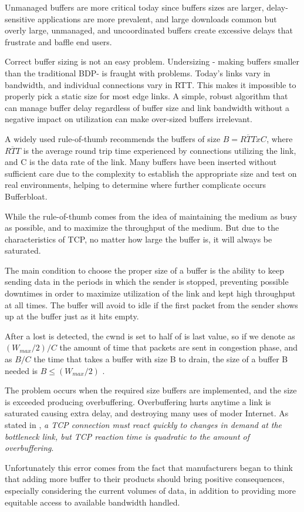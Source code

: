 Unmanaged buffers are more critical today since buffers sizes are larger,
delay-sensitive applications are more prevalent, and large downloads common
but overly large, unmanaged, and uncoordinated buffers create excessive delays
that frustrate and baffle end users.

Correct buffer sizing is not an easy problem. Undersizing - making buffers
smaller than the traditional BDP- is fraught with problems. Today's links vary
in bandwidth, and individual connections vary in RTT. This makes it impossible
to properly pick a static size for most edge links. A simple, robust algorithm
that can manage buffer delay regardless of buffer size and link bandwidth
without a negative impact on utilization can make over-sized buffers
irrelevant.

A widely used rule-of-thumb recommends the buffers of size $B = \overline{RTT}
x C $, where $\overline{RTT}$ is the average round trip time experienced by
connections utilizing the link, and C is the data rate of the link. Many
buffers have been inserted without sufficient care due to the complexity to
establish the appropriate size and test on real environments\cite{Vu-Brugier},
helping to determine where further complicate occurs Bufferbloat.

While the rule-of-thumb comes from the idea of ​​maintaining the medium as
busy as possible, and to maximize the throughput of the medium. But due to the
characteristics of TCP, no matter how large the buffer is, it will always be
saturated.

The main condition to choose the proper size of a buffer is the ability to
keep sending data in the periods in which the sender is stopped, preventing
possible downtimes in order to maximize utilization of the link and kept high
throughput at all times. The buffer will avoid to idle if the first packet
from the sender shows up at the buffer just as it hits empty.

After a lost is detected, the cwnd is set to half of is last value, so if we
denote as $(W_{max} /2)/C$ the amount of time that packets are sent in
congestion phase, and as $B/C$ the time that takes a buffer with size B to
drain, the size of a buffer B needed is $B \leq (W_{max} /2)$
\cite{main:ref:1}.

The problem occurs when the required size buffers are implemented, and the
size is exceeded producing overbuffering. Overbuffering hurts anytime a link
is saturated causing extra delay, and destroying many uses of moder Internet.
As stated in \cite{GettysNichols}, \textit{a TCP connection must react quickly
to changes in demand at the bottleneck link, but TCP reaction time is
quadratic to the amount of overbuffering}.

Unfortunately this error comes from the fact that manufacturers began to think
that adding more buffer to their products should bring positive consequences,
especially considering the current volumes of data, in addition to providing
more equitable access to available bandwidth handled.